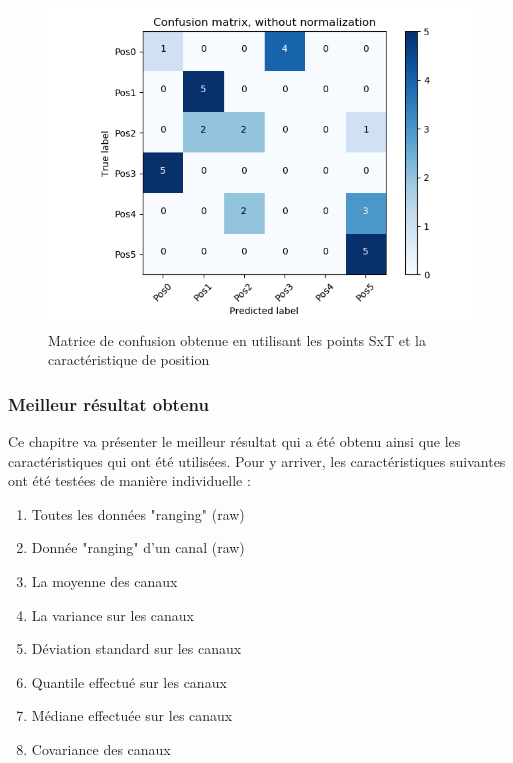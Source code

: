 \begin{figure}[htp]
 \begin{center}
  \includegraphics[scale=0.5]{figures/mat_pos_SxT_pos.png}
  \caption{Matrice de confusion obtenue en utilisant les points SxT et la caractéristique de position}
  \label{fig:matPosSxTPos} %
 \end{center}
\end{figure}

\subsubsection{Meilleur résultat obtenu}
Ce chapitre va présenter le meilleur résultat qui a été obtenu ainsi que les caractéristiques qui ont été utilisées. Pour y arriver, les caractéristiques suivantes ont été testées de manière individuelle :
 
\begin{enumerate}
 \item Toutes les données "ranging" (raw)
 \item Donnée "ranging" d'un canal (raw) 
 \item La moyenne des canaux
 \item La variance sur les canaux
 \item Déviation standard sur les canaux
 \item Quantile effectué sur les canaux
 \item Médiane effectuée sur les canaux 
 \item Covariance des canaux
\end{enumerate}

